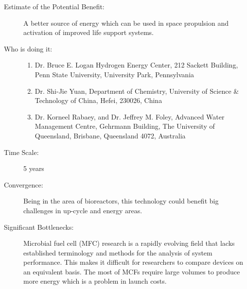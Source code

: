 \begin{description}
\item[Estimate  of the Potential Benefit:] A better source of energy which can
be used in space propulsion and  activation of improved life support
systems.
\item[Who is doing it:] \hfill
\begin{enumerate}
\item Dr. Bruce E. Logan Hydrogen  Energy Center, 212 Sackett Building,
Penn State  University, University Park, Pennsylvania
\item Dr. Shi-Jie Yuan, Department of  Chemistry, University of Science \&
Technology of China, Hefei, 230026,  China
\item Dr. Korneel Rabaey, and Dr.  Jeffrey M. Foley, Advanced Water
Management  Centre, Gehrmann Building, The University of Queensland,
Brisbane, Queensland 4072, Australia
\end{enumerate}
\item[Time Scale:] 5 years
\item[Convergence:] Being in the area  of bioreactors, this technology could
benefit big  challenges in up-cycle and energy areas.
\item[Significant Bottlenecks:]  Microbial fuel cell (MFC) research is a
rapidly evolving field that lacks  established terminology and methods
for the  analysis of system performance. This makes it difficult for
researchers to compare devices on an  equivalent basis.
The most of MCFs require large  volumes to produce more energy which is
a problem in launch costs.
\end{description}

 
